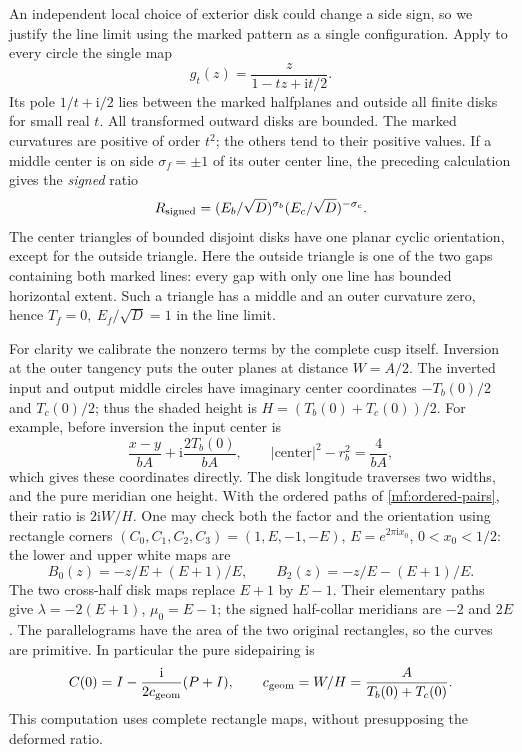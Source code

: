 \documentclass[11pt]{article}
\numberwithin{equation}{section}
\theoremstyle{definition}
\theoremstyle{remark}
\newcommand{\ii}{\mathrm i}
\begin{document}
An independent local choice of exterior disk could change a side
sign, so we justify the line limit using the marked pattern as a single configuration.
Apply to every circle the single map
\[
                  g_t(z)=\frac{z}{1-tz+\ii t/2}.
\]
Its pole \(1/t+\ii/2\) lies between the marked halfplanes and outside
all finite disks for small real \(t\). All transformed outward disks
are bounded. The marked curvatures are positive of order \(t^2\);
the others tend to their positive values. If a middle center is on
side \(\sigma_f=\pm1\) of its outer center line, the preceding
calculation gives the \emph{signed} ratio
\begin{equation}\label{mf:side-sign}
 R_{\rm signed}
  =(E_b/\sqrt D)^{\sigma_b}
        (E_c/\sqrt D)^{-\sigma_c}.
\end{equation}
The center triangles of bounded disjoint disks have one planar cyclic
orientation, except for the outside triangle. Here the outside
triangle is one of the two gaps containing both marked lines:
every gap with only one line has bounded horizontal extent.
Such a triangle has a middle and an outer curvature zero, hence
\(T_f=0,\ E_f/\sqrt D=1\) in the line limit.

For clarity we calibrate the nonzero terms by the complete cusp itself.
Inversion at the outer tangency puts the outer planes at distance
\(W=A/2\). The inverted input and output middle circles have imaginary
center coordinates \(-T_b(0)/2\) and \(T_c(0)/2\);
thus the shaded height is \(H=(T_b(0)+T_c(0))/2\).
For example, before inversion the input center is
\[
 \frac{x-y}{bA}+\ii\frac{2T_b(0)}{bA},
 \qquad |\text{center}|^2-r_b^2=\frac4{bA},
\]
which gives these coordinates directly.
The disk longitude traverses two widths, and the pure meridian one
height. With the ordered paths of \eqref{mf:ordered-pairs}, their
ratio is \(2\ii W/H\).
One may check both the factor and the orientation using rectangle
corners \((C_0,C_1,C_2,C_3)=(1,E,-1,-E)\),
\(E=e^{2\pi\ii x_0}\), \(0<x_0<1/2\):
the lower and upper white maps are
\[
 B_0(z)=-z/E+(E+1)/E,\qquad
 B_2(z)=-z/E-(E+1)/E.
\]
The two cross-half disk maps replace \(E+1\) by \(E-1\).
Their elementary paths give
\(\lambda=-2(E+1)\), \(\mu_0=E-1\);
the signed half-collar meridians are \(-2\) and \(2E\).
The parallelograms have the area of the two original rectangles,
so the curves are primitive. In particular the pure sidepairing is
\[
 C(0)=I-\frac{\ii}{2c_{\rm geom}}(P+I),
 \qquad c_{\rm geom}=W/H=\frac{A}{T_b(0)+T_c(0)}.
\]
This computation uses complete rectangle maps, without presupposing
the deformed ratio.
\end{document}
